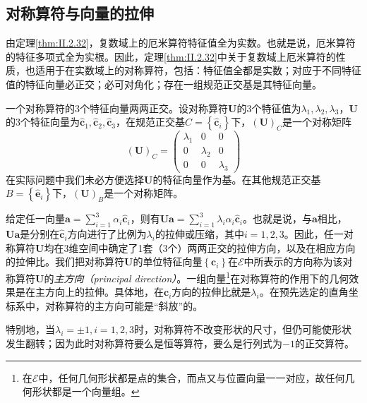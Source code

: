\documentclass[main.tex]{subfiles}
\begin{document}
\subsection{对称算符与向量的拉伸}
由定理\ref{thm:II.2.32}，复数域上的厄米算符特征值全为实数。也就是说，厄米算符的特征多项式全为实根。因此，定理\ref{thm:II.2.32}中关于复数域上厄米算符的性质，也适用于在实数域上的对称算符，包括：特征值全都是实数\cite[\S 5.3 定理3.4]{周胜林2012线性代数}；对应于不同特征值的特征向量必正交\cite[\S 5.3 定理3.5]{周胜林2012线性代数}；必可对角化\cite[\S 5.3 定理3.6]{周胜林2012线性代数}；存在一组规范正交基是其特征向量。

一个对称算符的3个特征向量两两正交。设对称算符$\mathbf{U}$的3个特征值为$\lambda_1,\lambda_2,\lambda_3$，$\mathbf{U}$的3个特征向量为$\mathbf{\hat{c}}_1,\mathbf{\hat{c}}_2,\mathbf{\hat{c}}_3$，在规范正交基$C=\left\{\mathbf{\hat{c}}_i\right\}$下，$\left(\mathbf{U}\right)_C$是一个对称矩阵
\[
    \left(\mathbf{U}\right)_C=\left(\begin{array}{ccc}\lambda_1&0&0\\0&\lambda_2&0\\0&0&\lambda_3\end{array}\right)
\]
在实际问题中我们未必方便选择$\mathbf{U}$的特征向量作为基。在其他规范正交基$B=\left\{\mathbf{\hat{e}}_i\right\}$下，$\left(\mathbf{U}\right)_B$是一个对称矩阵。

给定任一向量$\mathbf{a}=\sum_{i=1}^3\alpha_i\mathbf{\hat{c}}_i$，则有$\mathbf{Ua}=\sum_{i=1}^3\lambda_i\alpha_i\mathbf{\hat{c}}_i$。也就是说，与$\mathbf{a}$相比，$\mathbf{Ua}$是分别在$\mathbf{\hat{c}}_i$方向进行了比例为$\lambda_i$的拉伸或压缩，其中$i=1,2,3$。因此，任一对称算符$\mathbf{U}$均在3维空间中确定了1套（3个）两两正交的拉伸方向，以及在相应方向的拉伸比。我们把对称算符$\mathbf{U}$的单位特征向量$\left\{\mathbf{c}_i\right\}$在$\mathcal{E}$中所表示的方向称为该对称算符$\mathbf{U}$的\emph{主方向（principal direction）}。一组向量\footnote{在$\mathcal{E}$中，任何几何形状都是点的集合，而点又与位置向量一一对应，故任何几何形状都是一个向量组。}在对称算符的作用下的几何效果是在主方向上的拉伸。具体地，在$\mathbf{c}_i$方向的拉伸比就是$\lambda_i$。在预先选定的直角坐标系中，对称算符的主方向可能是“斜放”的。

特别地，当$\lambda_i=\pm 1,i=1,2,3$时，对称算符不改变形状的尺寸，但仍可能使形状发生翻转；因为此时对称算符要么是恒等算符，要么是行列式为$-1$的正交算符。
\end{document}
